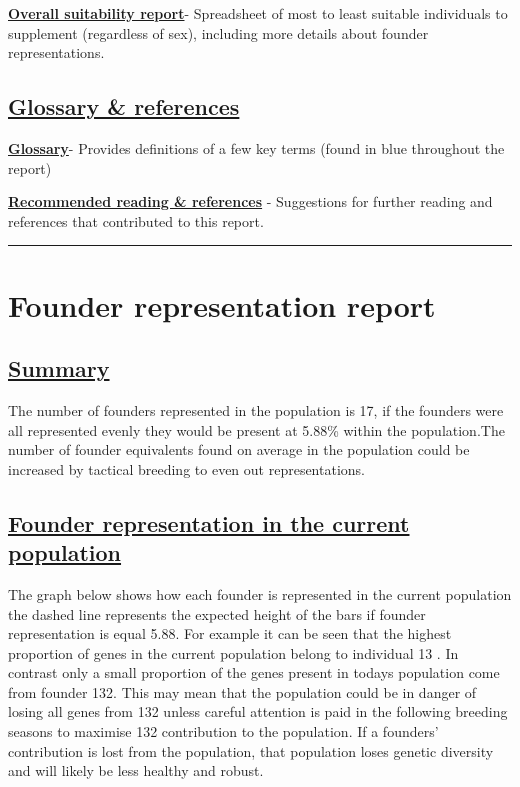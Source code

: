 \documentclass[12pt,]{article}
\begin{document}
\hyperlink{overall}{\textbf{Overall suitability report}}- Spreadsheet of
most to least suitable individuals to supplement (regardless of sex),
including more details about founder representations.

\subsection{\underline{\textbf{Glossary \& references}}}

\hyperlink{terms}{\textbf{Glossary}}- Provides definitions of a few key
terms (found in blue throughout the report)

\hyperlink{reading}{\textbf{Recommended reading \& references}} -
Suggestions for further reading and references that contributed to this
report.

\begin{center}\rule{0.5\linewidth}{\linethickness}\end{center}

\clearpage
\hypertarget{found_contrib}{\section{\textbf{Founder representation report}}}

\subsection{\underline{\textbf{Summary}}}

The number of founders represented in the population is 17, if the
founders were all represented evenly they would be present at 5.88\%
within the population.The number of founder equivalents found on average
in the population could be increased by tactical breeding to even out
representations.\newline
\subsection{\underline{\textbf{Founder representation in the current population}}}
The graph below shows how each founder is represented in the current
population the dashed line represents the expected height of the bars if
founder representation is equal 5.88. For example it can be seen that
the highest proportion of genes in the current population belong to
individual 13 . In contrast only a small proportion of the genes present
in todays population come from founder 132. This may mean that the
population could be in danger of losing all genes from 132 unless
careful attention is paid in the following breeding seasons to maximise
132 contribution to the population. If a founders' contribution is lost
from the population, that population loses genetic diversity and will
likely be less healthy and robust.\newline 
\end{document}
